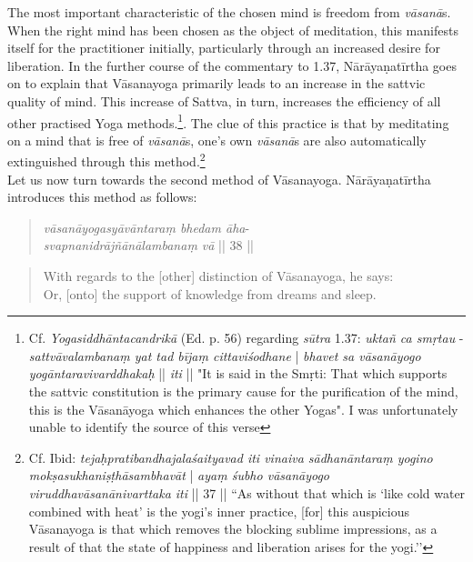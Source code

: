 The most important characteristic of the chosen mind is freedom from \textit{vāsanā}s. When the right mind has been chosen as the object of meditation, this manifests itself for the practitioner initially, particularly through an increased desire for liberation. In the further course of the commentary to 1.37, Nārāyaṇatīrtha goes on to explain that Vāsanayoga primarily leads to an increase in the sattvic quality of mind. This increase of Sattva, in turn, increases the efficiency of all other practised Yoga methods.\footnote{Cf. \textit{Yogasiddhāntacandrikā} (Ed. p. 56) regarding \textit{sūtra} 1.37: \textit{uktañ ca smṛtau} - \textit{sattvāvalambanaṃ yat tad bījaṃ cittaviśodhane} | \textit{bhavet sa vāsanāyogo yogāntaravivarddhakaḥ} || \textit{iti} || "It is said in the Smṛti: That which supports the sattvic constitution is the primary cause for the purification of the mind, this is the Vāsanāyoga which enhances the other Yogas". I was unfortunately unable to identify the source of this verse}. The clue of this practice is that by meditating on a mind that is free of \textit{vāsanā}s, one's own \textit{vāsanā}s are also automatically extinguished through this method.\footnote{Cf. Ibid: \textit{tejaḥpratibandhajalaśaityavad iti vinaiva sādhanāntaraṃ yogino mokṣasukhaniṣṭhāsambhavāt} | \textit{ayaṃ śubho vāsanāyogo viruddhavāsanānivarttaka iti} || 37 || ``As without that which is `like cold water combined with heat’ is the yogi's inner practice, [for] this auspicious Vāsanayoga is that which removes the blocking sublime impressions, as a result of that the state of happiness and liberation arises for the yogi.''}\\

Let us now turn towards the second method of Vāsanayoga. Nārāyaṇatīrtha introduces this method as follows:
\begin{quote}
\textit{vāsanāyogasyāvāntaraṃ bhedam āha}-\\
\textit{svapnanidrājñānālambanaṃ vā} || 38 ||
\end{quote}
\begin{quote}
With regards to the [other] distinction of Vāsanayoga, he says:\\ 
Or, [onto] the support of knowledge from dreams and sleep. 
\end{quote}

